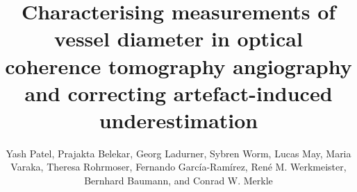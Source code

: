 \documentclass{optica-article}
\begin{document}
\title{Characterising measurements of vessel diameter in optical coherence tomography angiography and correcting artefact-induced underestimation}

\author{Yash Patel, Prajakta Belekar, Georg Ladurner, Sybren Worm, Lucas May, Maria Varaka, Theresa Rohrmoser, Fernando Garc\'{i}a-Ram\'{i}rez, Ren\'{e} M. Werkmeister, Bernhard Baumann, and Conrad W. Merkle}

\address{Center for Medical Physics and Biomedical Engineering, Medical University of Vienna, Währinger Gürtel 18-20/4L, 1090 Vienna, Austria\\
Institute of Biomedical Physics, Medical University of Innsbruck, Müllerstraße 44, 6020 Innsbruck, Austria}






\end{document}
